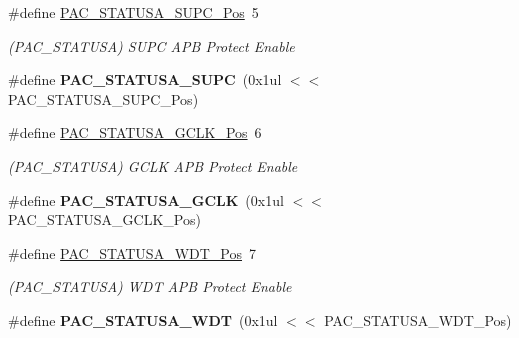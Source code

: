 \begin{DoxyCompactItemize}
\item 
\hypertarget{group___s_a_m_l21___p_a_c_ga82dcca6147d2ad915db3d11ff146ee31}{}\#define \hyperlink{group___s_a_m_l21___p_a_c_ga82dcca6147d2ad915db3d11ff146ee31}{P\+A\+C\+\_\+\+S\+T\+A\+T\+U\+S\+A\+\_\+\+S\+U\+P\+C\+\_\+\+Pos}~5\label{group___s_a_m_l21___p_a_c_ga82dcca6147d2ad915db3d11ff146ee31}

\begin{DoxyCompactList}\small\item\em (P\+A\+C\+\_\+\+S\+T\+A\+T\+U\+S\+A) S\+U\+P\+C A\+P\+B Protect Enable \end{DoxyCompactList}\item 
\hypertarget{group___s_a_m_l21___p_a_c_ga0ed439fc986d57d7e5c075d1885e3d45}{}\#define {\bfseries P\+A\+C\+\_\+\+S\+T\+A\+T\+U\+S\+A\+\_\+\+S\+U\+P\+C}~(0x1ul $<$$<$ P\+A\+C\+\_\+\+S\+T\+A\+T\+U\+S\+A\+\_\+\+S\+U\+P\+C\+\_\+\+Pos)\label{group___s_a_m_l21___p_a_c_ga0ed439fc986d57d7e5c075d1885e3d45}

\item 
\hypertarget{group___s_a_m_l21___p_a_c_ga0c584cd3a88f683cc7c93e9d1910caf5}{}\#define \hyperlink{group___s_a_m_l21___p_a_c_ga0c584cd3a88f683cc7c93e9d1910caf5}{P\+A\+C\+\_\+\+S\+T\+A\+T\+U\+S\+A\+\_\+\+G\+C\+L\+K\+\_\+\+Pos}~6\label{group___s_a_m_l21___p_a_c_ga0c584cd3a88f683cc7c93e9d1910caf5}

\begin{DoxyCompactList}\small\item\em (P\+A\+C\+\_\+\+S\+T\+A\+T\+U\+S\+A) G\+C\+L\+K A\+P\+B Protect Enable \end{DoxyCompactList}\item 
\hypertarget{group___s_a_m_l21___p_a_c_ga92f0c0145475418b24d30c53a90b2e72}{}\#define {\bfseries P\+A\+C\+\_\+\+S\+T\+A\+T\+U\+S\+A\+\_\+\+G\+C\+L\+K}~(0x1ul $<$$<$ P\+A\+C\+\_\+\+S\+T\+A\+T\+U\+S\+A\+\_\+\+G\+C\+L\+K\+\_\+\+Pos)\label{group___s_a_m_l21___p_a_c_ga92f0c0145475418b24d30c53a90b2e72}

\item 
\hypertarget{group___s_a_m_l21___p_a_c_ga15676949922ed43796d9045298acc87e}{}\#define \hyperlink{group___s_a_m_l21___p_a_c_ga15676949922ed43796d9045298acc87e}{P\+A\+C\+\_\+\+S\+T\+A\+T\+U\+S\+A\+\_\+\+W\+D\+T\+\_\+\+Pos}~7\label{group___s_a_m_l21___p_a_c_ga15676949922ed43796d9045298acc87e}

\begin{DoxyCompactList}\small\item\em (P\+A\+C\+\_\+\+S\+T\+A\+T\+U\+S\+A) W\+D\+T A\+P\+B Protect Enable \end{DoxyCompactList}\item 
\hypertarget{group___s_a_m_l21___p_a_c_gaaebc51115ad121f911bd4d66d7042812}{}\#define {\bfseries P\+A\+C\+\_\+\+S\+T\+A\+T\+U\+S\+A\+\_\+\+W\+D\+T}~(0x1ul $<$$<$ P\+A\+C\+\_\+\+S\+T\+A\+T\+U\+S\+A\+\_\+\+W\+D\+T\+\_\+\+Pos)\label{group___s_a_m_l21___p_a_c_gaaebc51115ad121f911bd4d66d7042812}


\end{DoxyCompactItemize}
